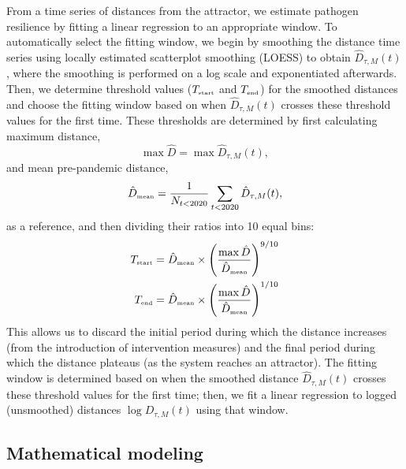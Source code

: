 \documentclass[12pt]{article}
\newcommand{\tsub}[2]{#1_{{\textrm{\tiny #2}}}}
\begin{document}
From a time series of distances from the attractor, we estimate pathogen resilience by fitting a linear regression to an appropriate window.
To automatically select the fitting window, we begin by smoothing the distance time series using locally estimated scatterplot smoothing (LOESS) to obtain $\hat{D}_{\tau,M}(t)$, where the smoothing is performed on a log scale and exponentiated afterwards.
Then, we determine threshold values ($\tsub{T}{start}$ and $\tsub{T}{end}$) for the smoothed distances and choose the fitting window based on when $\hat{D}_{\tau,M}(t)$ crosses these threshold values for the first time.
These thresholds are determined by first calculating maximum distance,
\begin{equation}
\max \hat{D} = \max \hat{D}_{\tau,M}(t),
\end{equation}
and mean pre-pandemic distance,
\begin{equation}
\tsub{\hat{D}}{mean} = \frac{1}{N_{t<2020}} \sum_{t < 2020} \hat{D}_{\tau,M}(t),
\end{equation}
as a reference, and then dividing their ratios into 10 equal bins:
\begin{align}
\tsub{T}{start} &= \tsub{\hat{D}}{mean} \times \left(\frac{\max \hat{D}}{\tsub{\hat{D}}{mean}} \right)^{9/10}\\
\tsub{T}{end} &= \tsub{\hat{D}}{mean} \times \left(\frac{\max \hat{D}}{\tsub{\hat{D}}{mean}} \right)^{1/10}
\end{align}
This allows us to discard the initial period during which the distance increases (from the introduction of intervention measures) and the final period during which the distance plateaus (as the system reaches an attractor).
The fitting window is determined based on when the smoothed distance $\hat{D}_{\tau,M}(t)$ crosses these threshold values for the first time; then, we fit a linear regression to logged (unsmoothed) distances $\log D_{\tau,M}(t)$ using that window.

\subsection*{Mathematical modeling}
\end{document}
